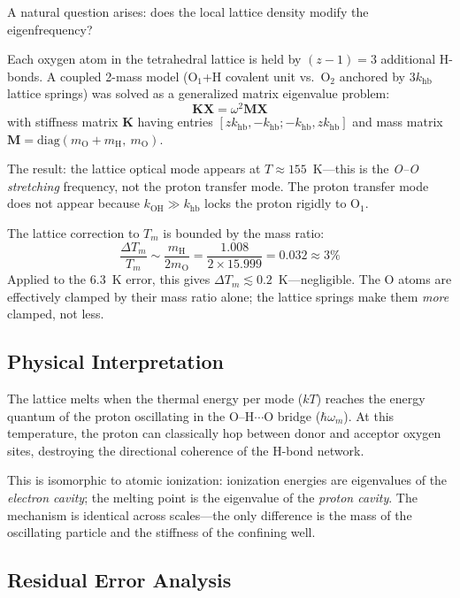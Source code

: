 A natural question arises: does the local lattice density modify the eigenfrequency?

Each oxygen atom in the tetrahedral lattice is held by $(z - 1) = 3$ additional 
H-bonds. A coupled 2-mass model (O$_1$+H covalent unit vs.\ O$_2$ anchored by 
$3 k_\text{hb}$ lattice springs) was solved as a generalized matrix eigenvalue 
problem:
\begin{equation}
  \mathbf{K} \mathbf{X} = \omega^2 \mathbf{M} \mathbf{X}
\end{equation}
with stiffness matrix $\mathbf{K}$ having entries $[z k_\text{hb}, -k_\text{hb}; 
-k_\text{hb}, z k_\text{hb}]$ and mass matrix $\mathbf{M} = 
\text{diag}(m_\text{O} + m_\text{H},\ m_\text{O})$.

The result: the lattice optical mode appears at $T \approx 155$~K---this is the 
\emph{O--O stretching} frequency, not the proton transfer mode. The proton 
transfer mode does not appear because $k_\text{OH} \gg k_\text{hb}$ locks the 
proton rigidly to O$_1$.

The lattice correction to $T_m$ is bounded by the mass ratio:
\begin{equation}
  \frac{\Delta T_m}{T_m} \sim \frac{m_\text{H}}{2 m_\text{O}} 
  = \frac{1.008}{2 \times 15.999} = 0.032 \approx 3\%
\end{equation}
Applied to the $6.3$~K error, this gives $\Delta T_m \lesssim 0.2$~K---negligible. 
The O atoms are effectively clamped by their mass ratio alone; the lattice springs 
make them \emph{more} clamped, not less.

\subsection{Physical Interpretation}

The lattice melts when the thermal energy per mode ($kT$) reaches the energy 
quantum of the proton oscillating in the O--H$\cdots$O bridge ($\hbar\omega_m$). 
At this temperature, the proton can classically hop between donor and acceptor 
oxygen sites, destroying the directional coherence of the H-bond network.

This is isomorphic to atomic ionization: ionization energies are eigenvalues of 
the \emph{electron cavity}; the melting point is the eigenvalue of the 
\emph{proton cavity}. The mechanism is identical across scales---the only 
difference is the mass of the oscillating particle and the stiffness of the 
confining well.

\subsection{Residual Error Analysis}


